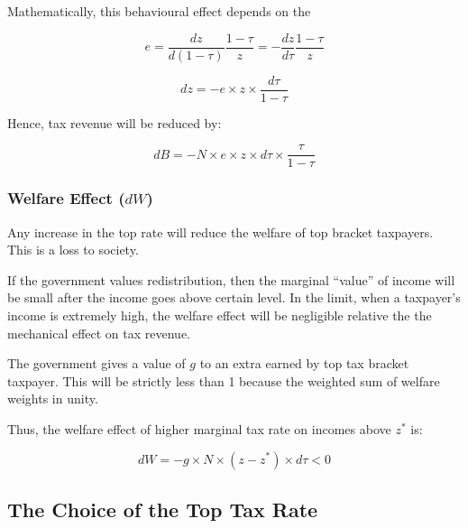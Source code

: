             Mathematically, this behavioural effect depends on the 

            \begin{equation*}
                e = \frac{d z}{d (1-\tau)} \frac{1-\tau}{z} = -\frac{d z}{d \tau} \frac{1-\tau}{z}
            \end{equation*}
            
            \begin{equation*}
                dz = -e \times z \times \frac{d\tau}{1-\tau}
            \end{equation*}

            Hence, tax revenue will be reduced by:

            \begin{equation}
                dB = - N \times e \times z \times d\tau \times \frac{\tau}{1-\tau}
                \label{eqn:tax_top_BR}
            \end{equation}

        \subsubsection{Welfare Effect ($dW$)}

            Any increase in the top rate will reduce the welfare of top bracket taxpayers. This is a loss to society.

            If the government values redistribution, then the marginal ``value'' of income will be small after the income goes above certain level. In the limit, when a taxpayer's income is extremely high, the welfare effect will be negligible relative the the mechanical effect on tax revenue.

            The government gives a value of $g$ to an extra  earned by top tax bracket taxpayer. This will be strictly less than 1 because the weighted sum of welfare weights in unity.

            Thus, the welfare effect of higher marginal tax rate on incomes above $z^*$ is:

            \begin{equation}
                dW = -g \times N \times (z-z^*) \times d\tau < 0
                \label{eqn:tax_top_WE}
            \end{equation}

    \subsection{The Choice of the Top Tax Rate}

